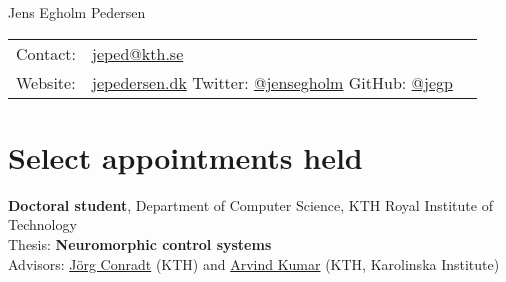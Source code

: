 \documentclass[11pt, a4paper]{article}
\newcommand{\years}[1]{\marginnote{\scriptsize #1}}
\begin{document}
{\LARGE Jens Egholm Pedersen}\\[.6cm]
\begin{tabular}{@{}l l l}
   Contact: & \href{mailto:jeped@kth.se}{jeped@kth.se} \\
   Website: & \href{https://jepedersen.dk}{jepedersen.dk}\hspace{1.6cm}
   Twitter: \href{https://twitter.com/jensegholm}{@jensegholm}\hspace{1.6cm}
   GitHub: \href{https://github.com/jegp/}{@jegp}
\end{tabular}


\section*{Select appointments held}
\years{2019-}\textbf{Doctoral student}, Department of Computer Science, 
KTH Royal Institute of Technology\\
Thesis: \textbf{Neuromorphic control systems}\\
Advisors: 
   \href{https://www.kth.se/profile/conr}{Jörg Conradt} (KTH) and 
   \href{https://www.kth.se/profile/arvindku}{Arvind Kumar} (KTH, Karolinska Institute)

\begin{comment}
\noindent
\years{2019-}\textbf{Doctoral student}, KTH Royal Institute of Technology,
Stockholm, Sweden.\\
Following the title of my thesis ``Neuromorphic control systems'', I work with
sparse, event-driven, and massively parallel brain-inspired algorithms to 
understand and construct goal-oriented and autonomous control systems.\\
\textit{Advisors}: \href{https://www.kth.se/profile/conr}{Jörg Conradt} and 
\href{https://www.kth.se/profile/arvindku}{Arvind Kumar}.
\\
\end{comment}
\end{document}
